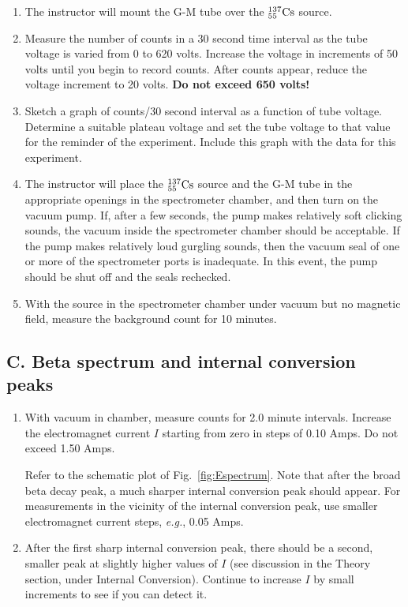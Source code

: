 \documentclass{article}
\newcommand{\cs}{${}^{137}_{55}{\rm Cs}$ }
\begin{document}
\begin{enumerate}
\item The instructor will mount the G-M tube over the \cs source.

\item Measure the number of counts in a 30 second time interval as the
tube voltage is varied from 0 to 620 volts.  Increase the voltage in
increments of 50 volts until you begin to record counts.  After counts
appear, reduce the voltage increment to 20 volts. {\bf Do not exceed 650
volts!}

\item Sketch a graph of counts/30 second interval as a function of tube
voltage.  Determine a suitable plateau voltage and set the tube
voltage to that value for the reminder of the experiment. 
Include this graph with the data for this experiment.

\item The instructor will place the \cs source and the G-M tube in
the appropriate openings in the spectrometer chamber, and then turn on
the vacuum pump.  If, after a few seconds, the pump makes relatively
soft clicking sounds, the vacuum inside the spectrometer chamber should
be acceptable.  If the pump makes relatively loud gurgling sounds,
then the vacuum seal of one or more of the spectrometer ports is
inadequate.  In this event, the pump should be shut off and the seals
rechecked.

\item With the source in the spectrometer chamber under vacuum but no
magnetic field, measure the background count for 10 minutes.

\end{enumerate}

\subsection{C.  Beta spectrum and internal conversion peaks}

\begin{enumerate}

\item With vacuum in chamber, measure counts for 2.0 minute intervals.
Increase the electromagnet current $I$ starting from zero in steps of
0.10 Amps.  Do not exceed 1.50 Amps.

Refer to the schematic plot of Fig.~\ref{fig:Espectrum}.  Note that after the broad beta
decay peak, a much sharper internal conversion peak should appear.
For measurements in the vicinity of the internal conversion peak, use
smaller electromagnet current steps, {\em e.g.}, 0.05 Amps.

\item After the first sharp internal conversion peak, there should be a
second, smaller peak at slightly higher values of $I$ (see discussion in
the Theory section, under Internal Conversion).  Continue to increase
$I$ by small increments to see if you can detect it.

\end{enumerate}
\end{document}
